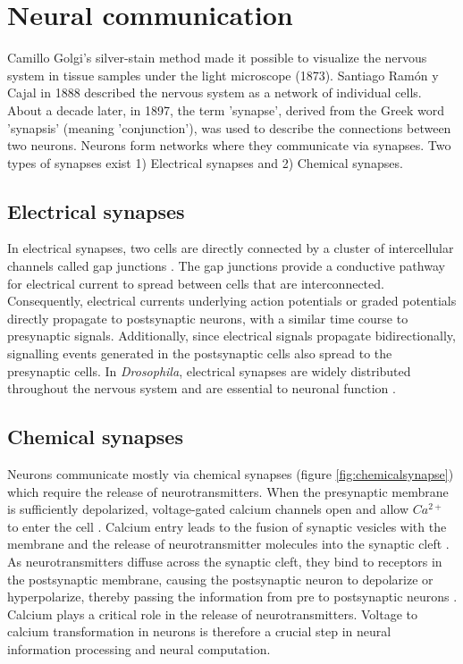\section{Neural communication}
Camillo Golgi's silver-stain method made it possible to visualize the nervous system in tissue samples under the light microscope (1873). Santiago Ramón y Cajal in 1888 described the nervous system as a network of individual cells. About a decade later, in 1897, the term 'synapse', derived from the Greek word 'synapsis' (meaning 'conjunction'), was used to describe the connections between two neurons. Neurons form networks where they communicate via synapses. Two types of synapses exist 1) Electrical synapses and 2) Chemical synapses.

\subsection{Electrical synapses}
In electrical synapses, two cells are directly connected by a cluster of intercellular channels called gap junctions \parencite{Bennett2004}. The gap junctions provide a conductive pathway for electrical current to spread between cells that are interconnected. Consequently, electrical currents underlying action potentials or graded potentials directly propagate to postsynaptic neurons, with a similar time course to presynaptic signals. Additionally, since electrical signals propagate bidirectionally, signalling events generated in the postsynaptic cells also spread to the presynaptic cells. In \textit{Drosophila}, electrical synapses are widely distributed throughout the nervous system and are essential to neuronal function \parencite{Ammer2022, Stebbings2002, Liu2016}.



\subsection{Chemical synapses}
Neurons communicate mostly via chemical synapses (figure  \ref{fig:chemicalsynapse}) which require the release of neurotransmitters. When the presynaptic membrane is sufficiently depolarized, voltage-gated calcium channels open and allow $Ca^{2+}$ to enter the cell \parencite{Luo2020}. Calcium entry leads to the fusion of synaptic vesicles with the membrane and the release of neurotransmitter molecules into the synaptic cleft \parencite{Chapman2002}.  As neurotransmitters diffuse across the synaptic cleft, they bind to receptors in the postsynaptic membrane, causing the postsynaptic neuron to depolarize or hyperpolarize, thereby passing the information from pre to postsynaptic neurons \parencite{Maio2008}. Calcium plays a critical role in the release of neurotransmitters. Voltage to calcium transformation in neurons is therefore a crucial step in neural information processing and neural computation. 

